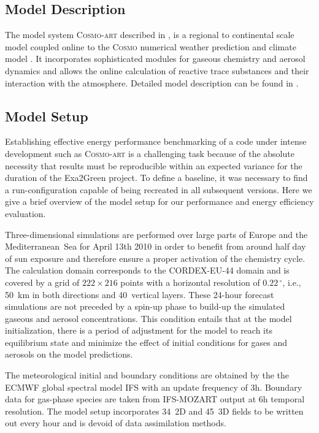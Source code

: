 \subsection{Model Description}
\label{subsec:1.1}

The model  system \textsc{Cosmo-art} described  in \citep{Vogel-2009},
is  a  regional to  continental  scale  model  coupled online  to  the
\textsc{Cosmo}   numerical  weather   prediction  and   climate  model
\citep{Baldauf-2011}.   It   incorporates  sophisticated  modules  for
gaseous  chemistry   and  aerosol  dynamics  and   allows  the  online
calculation of  reactive trace  substances and their  interaction with
the  atmosphere.    Detailed  model   description  can  be   found  in
\citep{Bangert-2012, Knote-2011, Knote-2013}.

\subsection{Model Setup}
\label{subsec:1.2}

Establishing effective energy performance benchmarking of a code under
intense development  such as \textsc{Cosmo-art} is  a challenging task
because of  the absolute necessity  that results must  be reproducible
within  an  expected  variance  for  the  duration  of  the  Exa2Green
project.  To   define  a  baseline,   it  was  necessary  to   find  a
run-configuration  capable  of   being  recreated  in  all  subsequent
versions.  Here  we give a brief  overview of the model  setup for our
performance and energy efficiency evaluation.

Three-dimensional simulations are performed over large parts of Europe
and the Mediterranean~Sea for April 13th 2010 in order to benefit from
around  half  day  of  sun  exposure and  therefore  ensure  a  proper
activation of the chemistry cycle.  The calculation domain corresponds
to the CORDEX-EU-44 domain and is covered by a grid of $222\times 216$
points with  a horizontal resolution of  $0.22\,^{\circ}$, i.e., 50~km
in  both directions  and 40~vertical  layers.  These  24-hour forecast
simulations  are not  preceded  by  a spin-up  phase  to build-up  the
simulated gaseous and  aerosol concentrations.  This condition entails
that at the model initialization,  there is a period of adjustment for
the model  to reach its equilibrium  state and minimize  the effect of
initial conditions for gases and aerosols on the model predictions.

The meteorological initial and boundary conditions are obtained by the
the ECMWF  global spectral model IFS  with an update  frequency of 3h.
Boundary data  for gas-phase species are taken  from IFS-MOZART output
at  6h temporal resolution.   The model  setup incorporates  34~2D and
45~3D  fields to  be written  out  every hour  and is  devoid of  data
assimilation methods.

